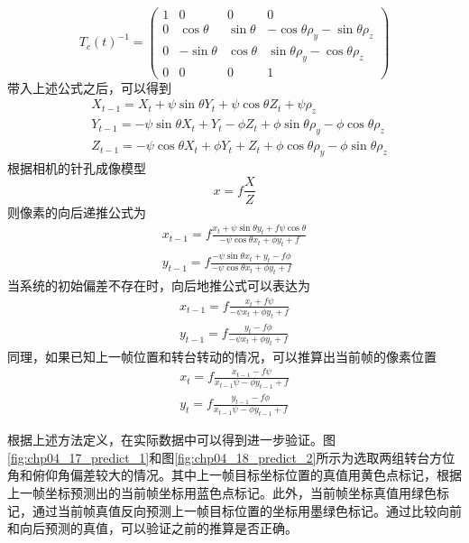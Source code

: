 \begin{equation}
T_c(t)^{-1} =\begin{pmatrix} 1 & 0 & 0 & 0 \\ 0 & \cos \theta & \sin \theta & -\cos \theta \rho_y -\sin \theta \rho_z \\0 & -\sin \theta & \cos \theta & \sin\theta \rho_y-\cos \theta \rho_z \\ 0 & 0 & 0 & 1 \end{pmatrix}
\end{equation}
带入上述公式之后，可以得到
\begin{align}
&X_{t-1} = X_t + \psi \sin \theta Y_t + \psi \cos \theta Z_t + \psi \rho_z \\
&Y_{t-1} = -\psi \sin \theta X_t +  Y_ t - \phi Z_t + \phi \sin \theta \rho_y - \phi \cos \theta \rho_z \\
&Z_{t-1}  = -\psi \cos \theta X_t + \phi  Y_ t + Z_t + \phi \cos \theta \rho_y - \phi \sin \theta \rho_z
\end{align}
根据相机的针孔成像模型
\begin{equation}
x = f \frac{X}{Z}
\end{equation}
则像素的向后递推公式为
\begin{align}
x_{t-1} = f\frac{x_t+\psi \sin \theta y_t + f\psi \cos \theta}{- \psi \cos \theta x_t + \phi y_t + f} \\
y_{t-1} = f\frac{-\psi \sin \theta x_t +y_t -f\phi}{- \psi \cos \theta x_t + \phi y_t + f}
\end{align}
当系统的初始偏差不存在时，向后地推公式可以表达为
\begin{align}
\label{eq:curr_predict_prev]}
x_{t-1} = f\frac{x_t + f\psi }{- \psi  x_t  + \phi y_t + f} \\
y_{t-1} = f\frac{y_t -f\phi}{- \psi  x_t + \phi y_t + f}
\end{align}
同理，如果已知上一帧位置和转台转动的情况，可以推算出当前帧的像素位置
\begin{align}
\label{eq:prev_predict_curr}
x_{t} = f\frac{x_{t-1} - f\psi }{x_{t-1}  \psi  - \phi y_{t-1} + f} \\
y_{t} = f\frac{y_{t-1} -f\phi}{  x_{t-1} \psi - \phi y_{t-1} + f}
\end{align}

根据上述方法定义，在实际数据中可以得到进一步验证。图\ref{fig:chp04_17_predict_1}和图\ref{fig:chp04_18_predict_2}所示为选取两组转台方位角和俯仰角偏差较大的情况。其中上一帧目标坐标位置的真值用黄色点标记，根据上一帧坐标预测出的当前帧坐标用蓝色点标记。此外，当前帧坐标真值用绿色标记，通过当前帧真值反向预测上一帧目标位置的坐标用墨绿色标记。通过比较向前和向后预测的真值，可以验证之前的推算是否正确。

